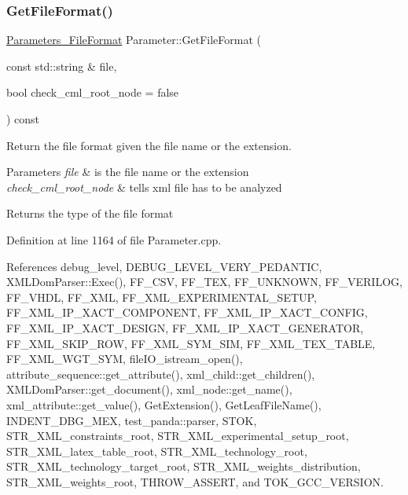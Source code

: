 \subsubsection{\texorpdfstring{Get\+File\+Format()}{GetFileFormat()}}
{\footnotesize\ttfamily \hyperlink{Parameter_8hpp_a67fa05fdc413fd22ad4f96d04e4f99f1}{Parameters\+\_\+\+File\+Format} Parameter\+::\+Get\+File\+Format (\begin{DoxyParamCaption}\item[{const std\+::string \&}]{file,  }\item[{bool}]{check\+\_\+cml\+\_\+root\+\_\+node = {\ttfamily false} }\end{DoxyParamCaption}) const}



Return the file format given the file name or the extension. 


\begin{DoxyParams}{Parameters}
{\em file} & is the file name or the extension \\
\hline
{\em check\+\_\+cml\+\_\+root\+\_\+node} & tells xml file has to be analyzed \\
\hline
\end{DoxyParams}
\begin{DoxyReturn}{Returns}
the type of the file format 
\end{DoxyReturn}


Definition at line 1164 of file Parameter.\+cpp.



References debug\+\_\+level, D\+E\+B\+U\+G\+\_\+\+L\+E\+V\+E\+L\+\_\+\+V\+E\+R\+Y\+\_\+\+P\+E\+D\+A\+N\+T\+IC, X\+M\+L\+Dom\+Parser\+::\+Exec(), F\+F\+\_\+\+C\+SV, F\+F\+\_\+\+T\+EX, F\+F\+\_\+\+U\+N\+K\+N\+O\+WN, F\+F\+\_\+\+V\+E\+R\+I\+L\+OG, F\+F\+\_\+\+V\+H\+DL, F\+F\+\_\+\+X\+ML, F\+F\+\_\+\+X\+M\+L\+\_\+\+E\+X\+P\+E\+R\+I\+M\+E\+N\+T\+A\+L\+\_\+\+S\+E\+T\+UP, F\+F\+\_\+\+X\+M\+L\+\_\+\+I\+P\+\_\+\+X\+A\+C\+T\+\_\+\+C\+O\+M\+P\+O\+N\+E\+NT, F\+F\+\_\+\+X\+M\+L\+\_\+\+I\+P\+\_\+\+X\+A\+C\+T\+\_\+\+C\+O\+N\+F\+IG, F\+F\+\_\+\+X\+M\+L\+\_\+\+I\+P\+\_\+\+X\+A\+C\+T\+\_\+\+D\+E\+S\+I\+GN, F\+F\+\_\+\+X\+M\+L\+\_\+\+I\+P\+\_\+\+X\+A\+C\+T\+\_\+\+G\+E\+N\+E\+R\+A\+T\+OR, F\+F\+\_\+\+X\+M\+L\+\_\+\+S\+K\+I\+P\+\_\+\+R\+OW, F\+F\+\_\+\+X\+M\+L\+\_\+\+S\+Y\+M\+\_\+\+S\+IM, F\+F\+\_\+\+X\+M\+L\+\_\+\+T\+E\+X\+\_\+\+T\+A\+B\+LE, F\+F\+\_\+\+X\+M\+L\+\_\+\+W\+G\+T\+\_\+\+S\+YM, file\+I\+O\+\_\+istream\+\_\+open(), attribute\+\_\+sequence\+::get\+\_\+attribute(), xml\+\_\+child\+::get\+\_\+children(), X\+M\+L\+Dom\+Parser\+::get\+\_\+document(), xml\+\_\+node\+::get\+\_\+name(), xml\+\_\+attribute\+::get\+\_\+value(), Get\+Extension(), Get\+Leaf\+File\+Name(), I\+N\+D\+E\+N\+T\+\_\+\+D\+B\+G\+\_\+\+M\+EX, test\+\_\+panda\+::parser, S\+T\+OK, S\+T\+R\+\_\+\+X\+M\+L\+\_\+constraints\+\_\+root, S\+T\+R\+\_\+\+X\+M\+L\+\_\+experimental\+\_\+setup\+\_\+root, S\+T\+R\+\_\+\+X\+M\+L\+\_\+latex\+\_\+table\+\_\+root, S\+T\+R\+\_\+\+X\+M\+L\+\_\+technology\+\_\+root, S\+T\+R\+\_\+\+X\+M\+L\+\_\+technology\+\_\+target\+\_\+root, S\+T\+R\+\_\+\+X\+M\+L\+\_\+weights\+\_\+distribution, S\+T\+R\+\_\+\+X\+M\+L\+\_\+weights\+\_\+root, T\+H\+R\+O\+W\+\_\+\+A\+S\+S\+E\+RT, and T\+O\+K\+\_\+\+G\+C\+C\+\_\+\+V\+E\+R\+S\+I\+ON.



